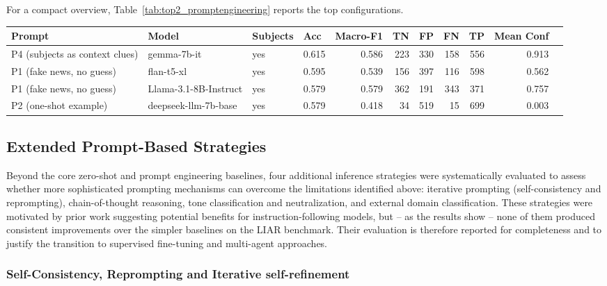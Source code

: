 For a compact overview, Table~\ref{tab:top2_promptengineering} reports the top configurations.

\begin{minipage}{\linewidth}
\centering
{}
\label{tab:top2_promptengineering}
\scriptsize
\begin{tabular}{l l l l r r r r r r r}
\toprule
Prompt & Model & Subjects & Acc & Macro-F1 & TN & FP & FN & TP & Mean Conf \\
\midrule
P4 (subjects as context clues) & gemma-7b-it           & yes & 0.615 & 0.586 & 223 & 330 & 158 & 556 & 0.913 \\
P1 (fake news, no guess)       & flan-t5-xl            & yes & 0.595 & 0.539 & 156 & 397 & 116 & 598 & 0.562 \\
P1 (fake news, no guess)       & Llama-3.1-8B-Instruct & yes & 0.579 & 0.579 & 362 & 191 & 343 & 371 & 0.757 \\
P2 (one-shot example)          & deepseek-llm-7b-base  & yes & 0.579 & 0.418 &  34 & 519 &  15 & 699 & 0.003 \\
\bottomrule
\end{tabular}
\end{minipage}

\subsection{Extended Prompt-Based Strategies}

Beyond the core zero-shot and prompt engineering baselines, four additional inference strategies were systematically evaluated to 
assess whether more sophisticated prompting mechanisms can overcome the limitations identified above: iterative prompting (self-consistency and reprompting), chain-of-thought reasoning, tone classification and neutralization, and external domain  classification. These strategies were motivated by prior work suggesting potential benefits for instruction-following models, 
but -- as the results show -- none of them produced consistent improvements over the simpler baselines on the LIAR benchmark. 
Their evaluation is therefore reported for completeness and to justify the transition to supervised fine-tuning and multi-agent 
approaches.

\subsubsection{Self-Consistency, Reprompting and Iterative self-refinement}


